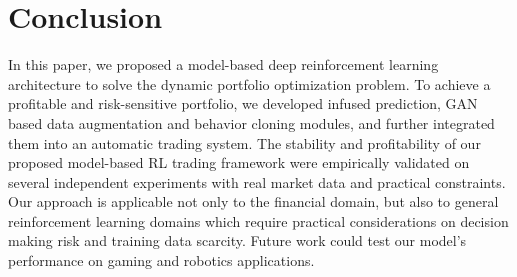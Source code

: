 \documentclass{article}
\begin{document}
\section{Conclusion}\label{sec5}
In this paper, we proposed a model-based deep reinforcement learning architecture to solve the dynamic portfolio optimization problem. To achieve a profitable and risk-sensitive portfolio, we developed infused prediction, GAN based data augmentation and behavior cloning modules, and further integrated them into an automatic trading system. The stability and profitability of our proposed model-based RL trading framework were empirically validated on several independent experiments with real market data and practical constraints. Our approach is applicable not only to the financial domain, but also to general reinforcement learning domains which require practical considerations on decision making risk and training data scarcity. Future work could test our model's performance on gaming and robotics applications. 









\appendix
~\newpage~\newpage
\end{document}
